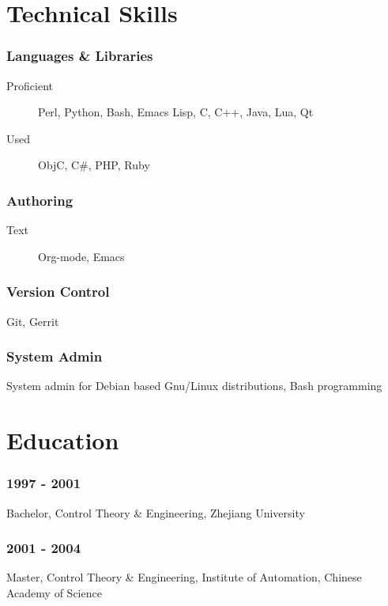 \documentclass[11pt,dvipdfmx,CJKbookmarks]{article}
\begin{document}
\begin{CJK*}{UTF8}{simsun}
\section{Technical Skills}
\label{sec:org6d76855}

\subsubsection{Languages \& Libraries}
\label{sec:orgc7dec56}
\begin{description}
\item[{Proficient}] Perl, Python, Bash, Emacs Lisp, C, C++, Java, Lua, Qt

\item[{Used}] ObjC, C\#, PHP, Ruby
\end{description}
\subsubsection{Authoring}
\label{sec:orgf877755}
\begin{description}
\item[{Text}] Org-mode, Emacs
\end{description}
\subsubsection{Version Control}
\label{sec:orga5b17b4}
Git, Gerrit
\subsubsection{System Admin}
\label{sec:orgda1bc73}
System admin for Debian based Gnu/Linux distributions, Bash
programming

\section{Education}
\label{sec:orgf048e3b}

\subsubsection{1997 - 2001}
\label{sec:org854216e}
Bachelor, Control Theory \& Engineering, Zhejiang University
\subsubsection{2001 - 2004}
\label{sec:org445a5d4}
Master, Control Theory \& Engineering, Institute of Automation,
Chinese Academy of Science


\end{CJK*}
\end{document}
